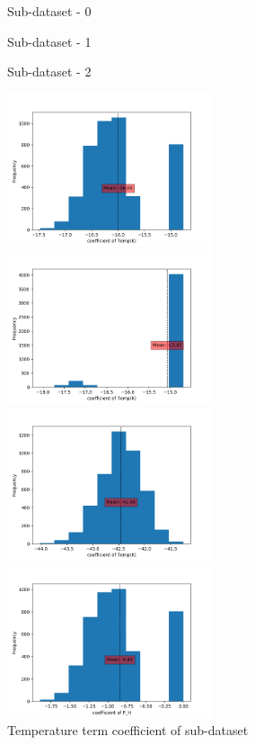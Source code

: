 \documentclass[preprint,12pt]{elsarticle}
\begin{document}
				    
				    \begin{figure}	[H]
				    	\begin{multicols}{3}
				    		\centering
				    		Sub-dataset - 0 \par
				    		Sub-dataset - 1 \par
				    		Sub-dataset - 2 \par
				    	\end{multicols}	
				    	\begin{multicols}{3}
				    		\includegraphics[width=6cm]{Temp0.png}\par 
				    		\includegraphics[width=6cm]{Temp1.png}\par 
				    		\includegraphics[width=6cm]{Temp2.png}\par 
				    	\end{multicols}
				    	\caption{Temperature term coefficient of sub-dataset}	  		  
				    	\begin{multicols}{3}
				    		\includegraphics[width=6cm]{PH0.png}\par

\end{multicols}
\end{figure}
\end{document}
